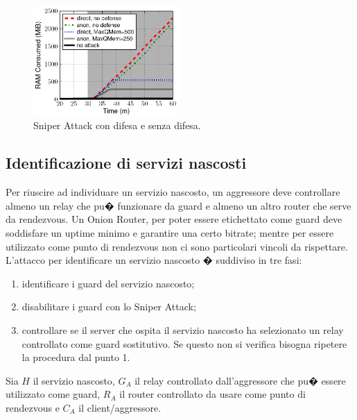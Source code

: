 \begin{figure}[!htbp]
\centering
\includegraphics[width=0.5\textwidth]{./figure//sniper}
\caption{Sniper Attack con difesa e senza difesa.}
\label{FIG:SnipDif}
\end{figure}

\subsection{Identificazione di servizi nascosti}
Per riuscire ad individuare un servizio nascosto, un aggressore deve controllare almeno un relay che pu� funzionare da guard e almeno un altro router che serve da rendezvous. Un Onion Router, per poter essere etichettato come guard deve soddisfare un uptime minimo e garantire una certo bitrate; mentre per essere utilizzato come punto di rendezvous non ci sono particolari vincoli da rispettare. L'attacco per identificare un servizio nascosto � suddiviso in tre fasi: 
\begin{enumerate}
\item identificare i guard del servizio nascosto;
\item disabilitare i guard con lo Sniper Attack;
\item controllare se il server che ospita il servizio nascosto ha selezionato un relay controllato come guard sostitutivo. Se questo non si verifica bisogna ripetere la procedura dal punto 1.
\end{enumerate}
Sia $H$ il servizio nascosto, $G_{A}$ il relay controllato dall'aggressore che pu� essere utilizzato come guard, $R_{A}$ il router controllato da usare come punto di rendezvous  e $C_{A}$ il client/aggressore. 

